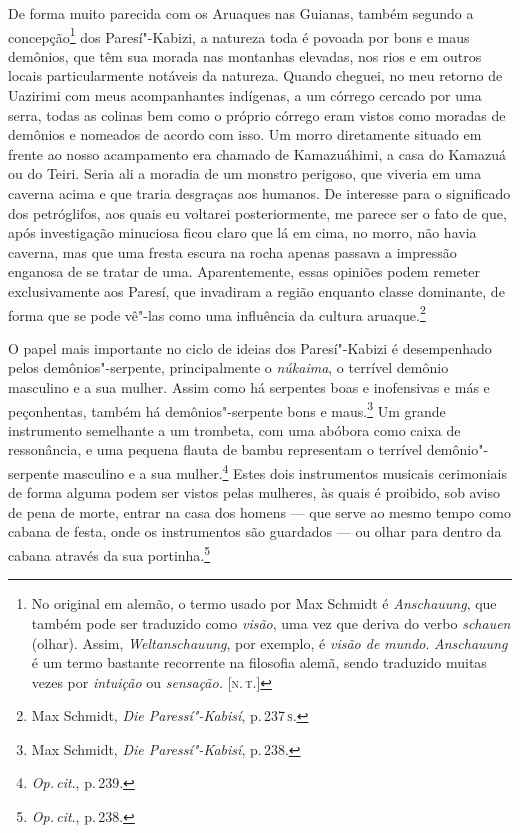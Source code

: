 De forma muito parecida com os Aruaques nas Guianas, também segundo a
concepção\footnote{No original em alemão, o termo usado por Max
  Schmidt é \textit{Anschauung}, que também pode ser traduzido como
  \textit{visão}, uma vez que deriva do verbo \textit{schauen} (olhar).
  Assim, \textit{Weltanschauung}, por exemplo, é \textit{visão de mundo}.
  \textit{Anschauung} é um termo bastante recorrente na filosofia alemã,
  sendo traduzido muitas vezes por \textit{intuição} ou \textit{sensação.}
  {[}\textsc{n.\,t.}{]}} dos Paresí"-Kabizi, a natureza toda é povoada por bons e maus
demônios, que têm sua morada nas montanhas elevadas, nos rios e em
outros locais particularmente notáveis da natureza. Quando cheguei, no
meu retorno de Uazirimi com meus acompanhantes indígenas, a um córrego
cercado por uma serra, todas as colinas bem como o próprio córrego eram
vistos como moradas de demônios e nomeados de acordo com isso. Um morro
diretamente situado em frente ao nosso acampamento era chamado de
Kamazuáhimi, a casa do Kamazuá ou do Teiri. Seria ali a moradia de um
monstro perigoso, que viveria em uma caverna acima e que traria
desgraças aos humanos. De interesse para o significado dos petróglifos,
aos quais eu voltarei posteriormente, me parece ser o fato de que, após
investigação minuciosa ficou claro que lá em cima, no morro, não havia
caverna, mas que uma fresta escura na rocha apenas passava a impressão
enganosa de se tratar de uma. Aparentemente, essas opiniões podem
remeter exclusivamente aos Paresí, que invadiram a região enquanto
classe dominante, de forma que se pode vê"-las como uma influência da
cultura aruaque.\footnote{Max Schmidt, \textit{Die Paressí"-Kabisí}, p.\,237\,\textsc{s}.}

{O papel mais importante no ciclo de ideias dos Paresí"-Kabizi é
desempenhado pelos demônios"-serpente, principalmente o \textit{núkaima},
o terrível demônio masculino e a sua mulher. Assim como há serpentes
boas e inofensivas e más e peçonhentas, também há demônios"-serpente
bons e maus.\footnote{Max Schmidt, \textit{Die Paressí"-Kabisí}, p.\,238.} Um
grande instrumento semelhante a um trombeta, com uma abóbora como caixa
de ressonância, e uma pequena flauta de bambu representam o terrível
demônio"-serpente masculino e a sua mulher.\footnote{\textit{Op.\,cit}., p.\,239.}
Estes dois instrumentos musicais cerimoniais de forma alguma podem ser
vistos pelas mulheres, às quais é proibido, sob aviso de pena de morte,
entrar na casa dos homens --- que serve ao mesmo tempo como cabana de
festa, onde os instrumentos são guardados --- ou olhar para dentro da
cabana através da sua portinha.\footnote{\textit{Op.\,cit}., p.\,238.}}

